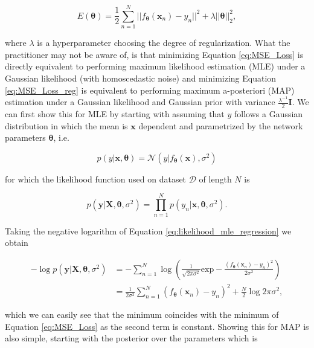\begin{equation}
    E(\mathbf{\bm{\theta}}) = \frac{1}{2}\sum^N_{n=1}||f_{\bm{\theta}}(\mathbf{x}_n)-y_n||^2 + \lambda||\bm{\theta}||^2_2,
    \label{eq:MSE_Loss_reg}
\end{equation}

\noindent where $\lambda$ is a hyperparameter choosing the degree of regularization. What the practitioner may not be aware of, is that minimizing Equation \ref{eq:MSE_Loss} is directly equivalent to performing maximum likelihood estimation (MLE) under a Gaussian likelihood (with homoscedastic noise) and minimizing Equation \ref{eq:MSE_Loss_reg} is equivalent to performing maximum a-posteriori (MAP) estimation under a Gaussian likelihood and Gaussian prior with variance $\frac{\lambda^{-1}}{2}\mathbf{I}$. We can first show this for MLE by starting with assuming that $y$ follows a Gaussian distribution in which the mean is $\mathbf{x}$ dependent and parametrized by the network parameters $\bm{\theta}$, i.e. 

\begin{equation}
    p(y|\mathbf{x}, \bm{\theta}) = \mathcal{N}(y|f_{\bm{\theta}}(\mathbf{x}), \sigma^2)
\end{equation}

\noindent for which the likelihood function used on dataset $\mathcal{D}$ of length $N$ is

\begin{equation}
    p(\mathbf{y}|\mathbf{X}, \bm{\theta}, \sigma^2) = \prod^N_{n=1}p(y_n|\mathbf{x}, \bm{\theta}, \sigma^2).
    \label{eq:likelihood_mle_regression}
\end{equation}

\noindent Taking the negative logarithm of Equation \ref{eq:likelihood_mle_regression} we obtain

\begin{align}
    -\log p(\mathbf{y}|\mathbf{X}, \bm{\theta}, \sigma^2) & = -\sum^N_{n=1}\log \left(\frac{1}{\sqrt{2\pi\sigma^2}}\text{exp}-\frac{(f_{\bm{\theta}}(\mathbf{x}_n)-y_n)^2}{2\sigma^2}\right)\\
    &= \frac{1}{2\sigma^2}\sum^N_{n=1}(f_{\bm{\theta}}(\mathbf{x}_n)-y_n)^2+\frac{N}{2}\log 2\pi\sigma^2,
\end{align}

\noindent which we can easily see that the minimum coincides with the minimum of Equation \ref{eq:MSE_Loss} as the second term is constant. Showing this for MAP is also simple, starting with the posterior over the parameters which is 

